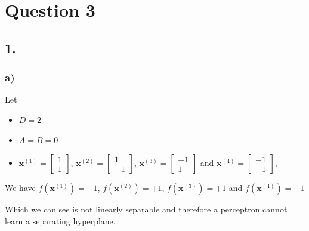 \documentclass[11pt]{article}
\begin{document}
\pagebreak

\section{Question 3}
\subsection{1.}
\subsubsection{a)}
Let
\begin{itemize}
  \item $D = 2$
  \item $A = B = 0$
  \item $\bm{x}^{(1)} = \begin{bmatrix} 1 \\ 1\end{bmatrix}$, $\bm{x}^{(2)} = \begin{bmatrix} 1 \\ -1\end{bmatrix}$, $\bm{x}^{(3)} = \begin{bmatrix} -1 \\ 1\end{bmatrix}$ and $\bm{x}^{(4)} = \begin{bmatrix} -1 \\ -1\end{bmatrix}$, 
  \end{itemize}
  We have $f ( \bm{x}^{(1)}) = -1$, $f ( \bm{x}^{(2)}) = +1$, $f ( \bm{x}^{(3)}) = +1$ and $f ( \bm{x}^{(4)}) = -1$

  \begin{figure}[H]
  \end{figure}
  Which we can see is not linearly separable and therefore a perceptron cannot learn a separating hyperplane.
\end{document}
